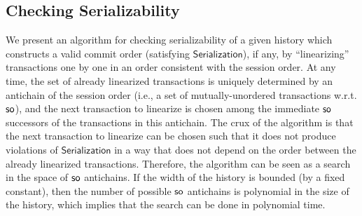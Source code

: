 \subsection{Checking Serializability}\label{ssec:ser_checking}

We present an algorithm for checking serializability of a given history which constructs a valid commit order (satisfying $\mathsf{Serialization}$), if any, by 
``linearizing'' transactions one by one in an order consistent with the session order. At any time, the set of already linearized transactions is uniquely determined by an antichain of the session order (i.e., a set of mutually-unordered transactions w.r.t. $\mathsf{so}$), and the next transaction to linearize is chosen among the immediate $\mathsf{so}$ successors of the transactions in this antichain. The crux of the algorithm is that the next transaction to linearize can be chosen such that it does not produce violations of $\mathsf{Serialization}$ in a way that  does not depend on the order between the already linearized transactions. Therefore, the algorithm can be seen as a search in the space of $\mathsf{so}$ antichains. If the width of the history is bounded (by a fixed constant), then the number of possible $\mathsf{so}$ antichains is polynomial in the size of the history, which implies that the search can be done in polynomial time.

